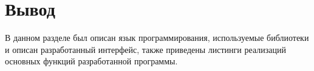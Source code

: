 



\section*{Вывод}

В данном разделе был описан язык программирования, используемые библиотеки и описан разработанный интерфейс, также приведены листинги реализаций основных функций разработанной программы.









